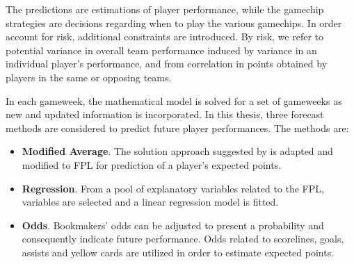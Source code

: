The predictions are estimations of player performance, while the gamechip strategies are decisions regarding when to play the various gamechips. In order account for risk, additional constraints are introduced. By risk, we refer to potential variance in overall team performance induced by variance in an individual player's performance, and from correlation in points obtained by players in the same or opposing teams.

\newpar

In each gameweek, the mathematical model is solved for a set of gameweeks as new and updated information is incorporated. In this thesis, three forecast methods are considered to predict future player performances. The methods are: 
\begin{itemize}
    \item \textbf{Modified Average}. The solution approach suggested by \cite{Bonomo} is adapted and modified to FPL for prediction of a player's expected points.
    \item \textbf{Regression}. From a pool of explanatory variables related to the FPL, variables are selected and a linear regression model is fitted. 
    \item \textbf{Odds}. Bookmakers' odds can be adjusted to present a probability and consequently indicate future performance. Odds related to scorelines, goals, assists and yellow cards are utilized in order to estimate expected points. 
\end{itemize}

